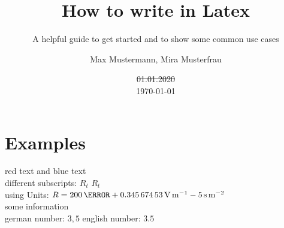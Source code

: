 \documentclass[	%
		fontsize=11pt,  %
		a4paper,	    %
		english,		%
		sans,			%
		f1,				%
	]{HsH-report}		%
\author{
	Max Mustermann,
	Mira Musterfrau
} %
\title{How to write in Latex}
\subtitle{A helpful guide to get started and to show some common use cases}
\date{\st{01.01.2020}\\\today}
\begin{document}

\frontmatter

\maketitle[c]

\declarationAuthorship

\begin{abstract}
	\lipsum[5-6]
\end{abstract}

\tableofcontents

\mainmatter


\chapter{Examples} \label{chap: one}
	{\color{red}red text} and {\color{blue}blue text} \\
	different subscripts: \normalsubscripts$R_t$ \upsubscripts$R_t$ \\
	using Units: $R=200\,\mohm + \SI{0.34567453}{\volt\per\metre} - 5\,\si{\second\per\metre\squared}$ \\
	some information\cite{laboranleitung:physik}\\
	german number: $3,5$ english number: $3.5$\\ %
\end{document}
